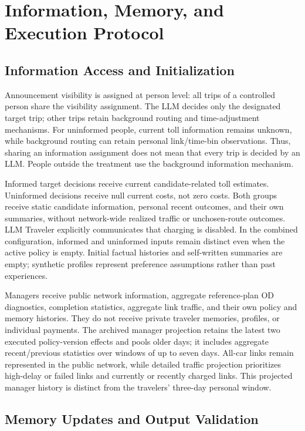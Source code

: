 \section{Information, Memory, and Execution Protocol}
\label{app:implementation}

\subsection{Information Access and Initialization}

Announcement visibility is assigned at person level: all trips of a controlled person share the visibility assignment. The LLM decides only the designated target trip; other trips retain background routing and time-adjustment mechanisms. For uninformed people, current toll information remains unknown, while background routing can retain personal link/time-bin observations. Thus, sharing an information assignment does not mean that every trip is decided by an LLM. People outside the treatment use the background information mechanism.

Informed target decisions receive current candidate-related toll estimates. Uninformed decisions receive null current costs, not zero costs. Both groups receive static candidate information, personal recent outcomes, and their own summaries, without network-wide realized traffic or unchosen-route outcomes. LLM Traveler explicitly communicates that charging is disabled. In the combined configuration, informed and uninformed inputs remain distinct even when the active policy is empty. Initial factual histories and self-written summaries are empty; synthetic profiles represent preference assumptions rather than past experiences.

Managers receive public network information, aggregate reference-plan OD diagnostics, completion statistics, aggregate link traffic, and their own policy and memory histories. They do not receive private traveler memories, profiles, or individual payments. The archived manager projection retains the latest two executed policy-version effects and pools older days; it includes aggregate recent/previous statistics over windows of up to seven days. All-car links remain represented in the public network, while detailed traffic projection prioritizes high-delay or failed links and currently or recently charged links. This projected manager history is distinct from the travelers' three-day personal window.

\subsection{Memory Updates and Output Validation}

